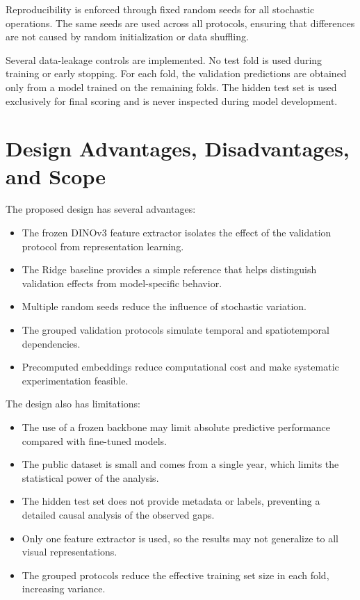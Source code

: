 Reproducibility is enforced through fixed random seeds for all stochastic operations. The same seeds are used across all protocols, ensuring that differences are not caused by random initialization or data shuffling.

Several data-leakage controls are implemented. No test fold is used during training or early stopping. For each fold, the validation predictions are obtained only from a model trained on the remaining folds. The hidden test set is used exclusively for final scoring and is never inspected during model development.


\section{Design Advantages, Disadvantages, and Scope}

The proposed design has several advantages:

\begin{itemize}
    \item The frozen DINOv3 feature extractor isolates the effect of the validation protocol from representation learning.
    \item The Ridge baseline provides a simple reference that helps distinguish validation effects from model-specific behavior.
    \item Multiple random seeds reduce the influence of stochastic variation.
    \item The grouped validation protocols simulate temporal and spatiotemporal dependencies.
    \item Precomputed embeddings reduce computational cost and make systematic experimentation feasible.
\end{itemize}

The design also has limitations:

\begin{itemize}
    \item The use of a frozen backbone may limit absolute predictive performance compared with fine-tuned models.
    \item The public dataset is small and comes from a single year, which limits the statistical power of the analysis.
    \item The hidden test set does not provide metadata or labels, preventing a detailed causal analysis of the observed gaps.
    \item Only one feature extractor is used, so the results may not generalize to all visual representations.
    \item The grouped protocols reduce the effective training set size in each fold, increasing variance.
\end{itemize}

